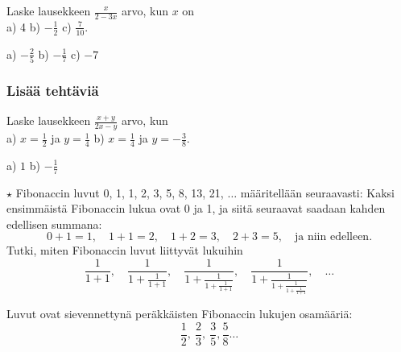 \begin{tehtavasivu}
\begin{tehtava}
Laske lausekkeen $\frac{x}{2-3x}$ arvo, kun $x$ on \\ a) 4 \qquad b) $-\frac{1}{2}$ \qquad c) $\frac{7}{10}$.
\begin{vastaus}
a) $-\frac{2}{5}$ \qquad b) $-\frac{1}{7}$ \qquad c) $-7$
\end{vastaus}
\end{tehtava}


\subsubsection*{Lisää tehtäviä}

\begin{tehtava}
Laske lausekkeen $\frac{x+y}{2x-y}$ arvo, kun \\ a) $x=\frac{1}{2}$ ja $y= \frac{1}{4}$ \qquad b) $x=\frac{1}{4}$ ja $y= -\frac{3}{8}$.
\begin{vastaus}
a) $1$ \qquad b) $-\frac{1}{7}$
\end{vastaus}
\end{tehtava}

\begin{tehtava}
$\star$ Fibonaccin luvut 0, 1, 1, 2, 3, 5, 8, 13, 21, $\ldots$ määritellään seuraavasti: Kaksi ensimmäistä
Fibonaccin lukua ovat 0 ja 1, ja siitä seuraavat saadaan kahden
edellisen summana: 
\[ 0+1=1, \quad 1+1=2, \quad 1+2 = 3, \quad 2+3=5, \quad 
\textrm{ja niin edelleen.} \]
Tutki, miten Fibonaccin luvut liittyvät lukuihin
\[ \frac{1}{1+1}, \quad \frac{1}{1+\frac{1}{1+1}}, \quad
\frac{1}{1+\frac{1}{1+\frac{1}{1+1}}}, \quad 
\frac{1}{1+\frac{1}{1+\frac{1}{1+\frac{1}{1+1}}}}, \quad \ldots\]
\begin{vastaus}
Luvut ovat sievennettynä peräkkäisten Fibonaccin
lukujen osamääriä:
\[\frac{1}{2}, \ \frac{2}{3}, \ \frac{3}{5}, \frac{5}{8} \ldots  \]
\end{vastaus}
\end{tehtava}


 
    

\end{tehtavasivu}

